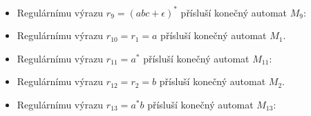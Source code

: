 \documentclass[a4paper,11pt]{article}[24.3.2010]
\begin{document}
\begin{enumerate}
\begin{enumerate}
\begin{itemize}
        \item Regulárnímu výrazu $r_{9}=(abc+\epsilon)^*$ přísluší konečný automat $M_{9}$:
        \begin{figure}[h!]
        \begin{center}
        \end{center}
        \end{figure}
        \item Regulárnímu výrazu $r_{10}=r_{1}=a$ přísluší konečný automat $M_{1}$. 
        \item Regulárnímu výrazu $r_{11}=a^*$ přísluší konečný automat $M_{11}$:
        \begin{figure}[h!]
        \begin{center}
        \end{center}
        \end{figure}
        \item Regulárnímu výrazu $r_{12}=r_{2}=b$ přísluší konečný automat $M_{2}$.
        \item Regulárnímu výrazu $r_{13}=a^*b$ přísluší konečný automat $M_{13}$:
        \begin{figure}[h!]
        \begin{center}
        \end{center}
        \end{figure}
        


\end{itemize}
\end{enumerate}
\end{enumerate}
\end{document}
